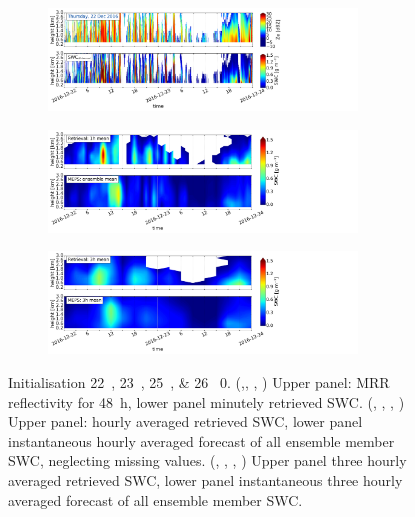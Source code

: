 \begin{figure}[H]
	\centering
	\begin{subfigure}[t]{\textwidth}
		\centering
		\includegraphics[trim={0.cm 2.2cm 19.cm 0.5cm},clip,width=0.9\textwidth]{./fig_obs_ret/20161222}
		\caption{}\label{fig:SWC:ret_22}
	\end{subfigure}
	\begin{subfigure}[t]{\textwidth}
		\centering
		\includegraphics[trim={0.cm 2.2cm 19.cm 0.5cm},clip,width=0.9\textwidth]{./fig_vert_SWC_EM/20161222}
		\caption{}\label{fig:SWC_EM:22}
	\end{subfigure}
	\begin{subfigure}[t]{\textwidth}
		\centering
		\includegraphics[trim={0.cm 0.8cm 19.cm 0.5cm},clip,width=0.9\textwidth]{./fig_vert_SWC_3h/20161222}
		\caption{}\label{fig:SWC3h:22}
	\end{subfigure}
	\caption{Initialisation \SIlist{22;23;25;26}{\dec} \SI{0}{\UTC}. 
		(\protect{},\protect{}, \protect{}, \protect{}) Upper panel: MRR reflectivity for \SI{48}{\hour}, lower panel minutely retrieved SWC. 
		(\protect{}, \protect{}, \protect{}, \protect{}) Upper panel: hourly averaged retrieved SWC, lower panel instantaneous hourly averaged forecast of all ensemble member SWC, neglecting missing values. 
		(\protect{}, \protect{}, \protect{}, \protect{}) Upper panel three hourly averaged retrieved SWC, lower panel instantaneous three hourly averaged forecast of all ensemble member SWC.   }\label{fig:ret:SWC}
\end{figure}
